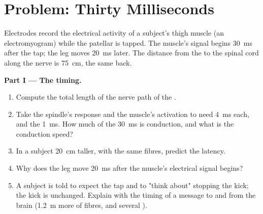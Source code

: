 \section{Problem: Thirty Milliseconds}

\begin{problem}
\label{pb:g12:stretch-reflex:1}
Electrodes record the electrical activity of a subject's thigh muscle
(an electromyogram) while the patellar  is tapped. The muscle's
signal begins \qty{30}{ms} after the tap; the leg moves \qty{20}{ms}
later. The distance from the  to the spinal cord along the
nerve is \qty{75}{cm}, the same back.

\medskip
\noindent\textbf{Part I --- The timing.}
\begin{enumerate}
  \item Compute the total length of the nerve path of the .
  \item Take the spindle's response and the muscle's activation to
        need \qty{4}{ms} each, and the  \qty{1}{ms}. How much
        of the \qty{30}{ms} is conduction, and what is the conduction
        speed?
  \item In a subject \qty{20}{cm} taller, with the same fibres,
        predict the latency.
  \item Why does the leg move \qty{20}{ms} after the muscle's
        electrical signal begins?
  \item A subject is told to expect the tap and to "think about"
        stopping the kick; the kick is unchanged. Explain with the
        timing of a message to and from the brain (\qty{1.2}{m} more of
        fibres, and several ).
\end{enumerate}


\end{problem}
